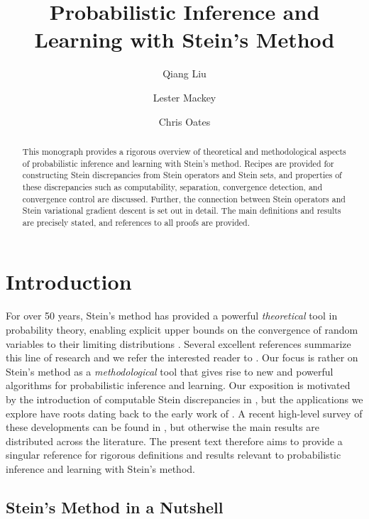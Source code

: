 \documentclass[12pt,paper=letter]{scrreprt}
\author[1]{Qiang Liu}
\author[2]{Lester Mackey}
\author[3,4]{Chris Oates}
\affil[1]{University of Texas at Austin}
\affil[2]{Microsoft Research}
\affil[3]{Newcastle University}
\affil[4]{The Alan Turing Institute}
\title{Probabilistic Inference and Learning with Stein's Method}
\begin{document}
\maketitle

\begin{abstract}
This monograph provides a rigorous overview of theoretical and methodological aspects of probabilistic inference and learning with Stein's method.
Recipes are provided for constructing Stein discrepancies from Stein operators and Stein sets, and properties of these discrepancies such as computability, separation, convergence detection, and convergence control are discussed.
Further, the connection between Stein operators and Stein variational gradient descent is set out in detail.
The main definitions and results are precisely stated, and references to all proofs are provided.
\end{abstract}

\clearpage

\tableofcontents

\clearpage

\chapter{Introduction}
\label{chap: intro}


For over 50 years, Stein's method has provided a powerful \emph{theoretical} tool in probability theory, enabling explicit upper bounds on the convergence of random variables to their limiting distributions  \citep{stein1972bound}.
Several excellent references summarize this line of research and we refer the interested reader to \citet{barbour2005introduction,chen2010normal,Ross2011,LeyReSw2017}.
Our focus is rather on Stein's method as a \emph{methodological} tool that gives rise to new and powerful algorithms for probabilistic inference and learning. 
Our exposition is motivated by the introduction of computable Stein discrepancies in \citet{gorham2015measuring}, but the applications we explore have roots dating back to the early work of \citet{stein1986approximate,stein2004use}. 
A recent high-level survey of these developments can be found in \citet{anastasiou2021stein}, but otherwise the main results are distributed across the literature.
The present text therefore aims to provide a singular reference for rigorous definitions and results relevant to probabilistic inference and learning with Stein’s method.


\section{Stein's Method in a Nutshell}
\end{document}
